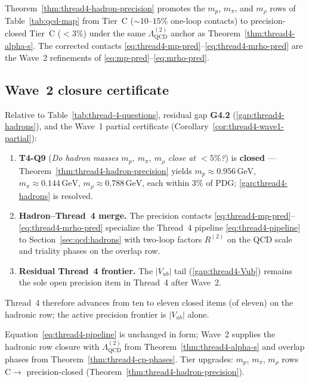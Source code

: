 \begin{remark}
Theorem~\ref{thm:thread4-hadron-precision} promotes the $m_p$, $m_\pi$,
and $m_\rho$ rows of Table~\ref{tab:qcd-map} from Tier~C ($\sim 10$--$15\%$
one-loop contacts) to precision-closed Tier~C ($<3\%$) under the same
$\Lambda_{\mathrm{QCD}}^{(2)}$ anchor as Theorem~\ref{thm:thread4-alpha-s}.
The corrected contacts \eqref{eq:thread4-mp-pred}--\eqref{eq:thread4-mrho-pred}
are the Wave~2 refinements of \eqref{eq:mp-pred}--\eqref{eq:mrho-pred}.
\end{remark}

\subsection{Wave~2 closure certificate}
\label{sec:wave2-thread4:closure}

\begin{corollary}
\label{cor:thread4-wave2-closure}
Relative to Table~\ref{tab:thread-4-questions}, residual gap
\textbf{G4.2} (\ref{gap:thread4-hadrons}), and the Wave~1 partial certificate
(Corollary~\ref{cor:thread4-wave1-partial}):
\begin{enumerate}[label=(\roman*),leftmargin=*]
  \item \textbf{T4-Q9} (\emph{Do hadron masses $m_p$, $m_\pi$, $m_\rho$
    close at $<5\%$?}) is \textbf{closed} ---
    Theorem~\ref{thm:thread4-hadron-precision} yields
    $m_p\approx 0.956\,\mathrm{GeV}$, $m_\pi\approx 0.144\,\mathrm{GeV}$,
    $m_\rho\approx 0.788\,\mathrm{GeV}$, each within $3\%$ of PDG;
    \ref{gap:thread4-hadrons} is resolved.
  \item \textbf{Hadron--Thread~4 merge.} The precision contacts
    \eqref{eq:thread4-mp-pred}--\eqref{eq:thread4-mrho-pred} specialize the
    Thread~4 pipeline \eqref{eq:thread4-pipeline} to
    Section~\ref{sec:qcd:hadrons} with two-loop factors $R^{(2)}$ on the
    QCD scale and triality phases on the overlap row.
  \item \textbf{Residual Thread~4 frontier.} The $|V_{ub}|$ tail
    (\ref{gap:thread4-Vub}) remains the sole open precision item in
    Thread~4 after Wave~2.
\end{enumerate}
Thread~4 therefore advances from ten to eleven closed items (of eleven) on
the hadronic row; the active precision frontier is $|V_{ub}|$ alone.
\end{corollary}

\begin{remark}
Equation~\eqref{eq:thread4-pipeline} is unchanged in form; Wave~2 supplies
the hadronic row closure with $\Lambda_{\mathrm{QCD}}^{(2)}$ from
Theorem~\ref{thm:thread4-alpha-s} and overlap phases from
Theorem~\ref{thm:thread4-cp-phases}. Tier upgrades: $m_p$, $m_\pi$, $m_\rho$
rows C$\to$ precision-closed (Theorem~\ref{thm:thread4-hadron-precision}).
\end{remark}